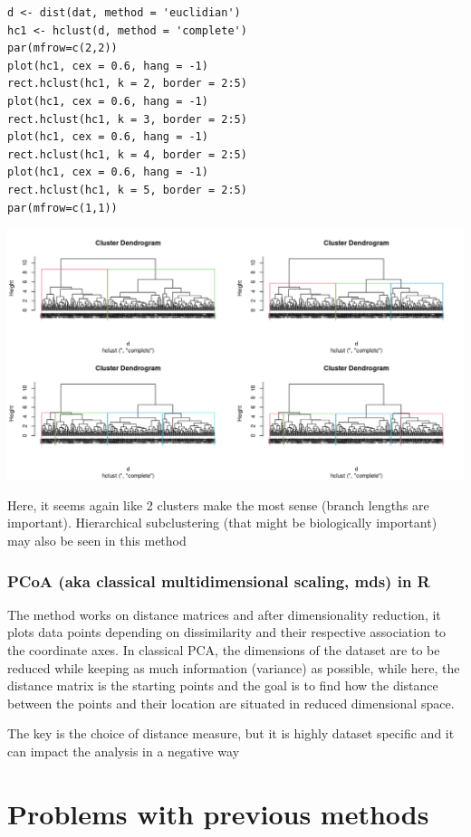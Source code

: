 \documentclass{article}
\begin{document}
\begin{lstlisting}
d <- dist(dat, method = 'euclidian')
hc1 <- hclust(d, method = 'complete')
par(mfrow=c(2,2))
plot(hc1, cex = 0.6, hang = -1)
rect.hclust(hc1, k = 2, border = 2:5)
plot(hc1, cex = 0.6, hang = -1)
rect.hclust(hc1, k = 3, border = 2:5)
plot(hc1, cex = 0.6, hang = -1)
rect.hclust(hc1, k = 4, border = 2:5)
plot(hc1, cex = 0.6, hang = -1)
rect.hclust(hc1, k = 5, border = 2:5)
par(mfrow=c(1,1)) 
\end{lstlisting}

\begin{center}
    \includegraphics[width = 1.12\textwidth]{lab5/hierarchical.png}
\end{center}
Here, it seems again like 2 clusters make the most sense (branch lengths are important). Hierarchical subclustering (that might be biologically important) may also be seen in this method

\subsubsection{PCoA (aka classical multidimensional scaling, mds) in R}
The method works on distance matrices and after dimensionality reduction, it plots data points depending on dissimilarity and their respective association to the coordinate axes. In classical PCA, the dimensions of the dataset are to be reduced while keeping as much information (variance) as possible, while here, the distance matrix is the starting points and the goal is to find how the distance between the points and their location are situated in reduced dimensional space. \par 
The key is the choice of distance measure, but it is highly dataset specific and it can impact the analysis in a negative way

\section{Problems with previous methods}
\end{document}
